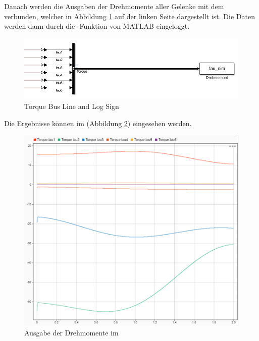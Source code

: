 \vspace{2cm}

Danach werden die Ausgaben der Drehmomente aller Gelenke mit dem  verbunden, welcher in Abbildung \ref{fig:simulink_logging} auf der linken Seite dargestellt ist.
Die Daten werden dann durch die -Funktion von MATLAB eingeloggt.

\begin{figure}[!htbp]
	\centering
	\includegraphics[width=0.8\linewidth]{grafic/torque_busline}
	\caption{Torque Bus Line and Log Sign}
	\label{fig:simulink_logging}
\end{figure}

Die Ergebnisse können im  (Abbildung \ref{fig:drehmomente_simulation}) eingesehen werden.

\begin{figure}[!htbp]
	\centering
	\includegraphics[width=0.5\linewidth]{grafic/Drehmomente}
	\caption{Ausgabe der Drehmomente im }
	\label{fig:drehmomente_simulation}
\end{figure}

